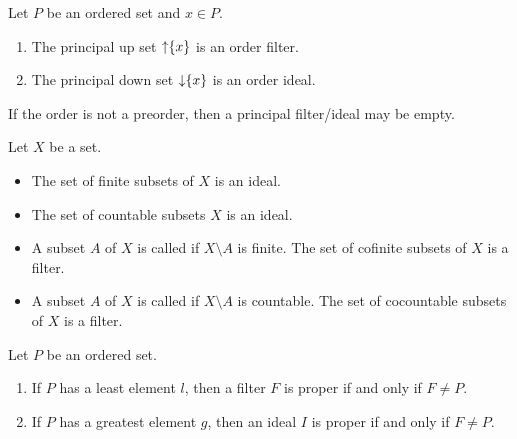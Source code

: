 \begin{lemma}
Let $P$ be an ordered set and $x\in P$.
\begin{enumerate}
\item The principal up set $\operatorname{\uparrow} \{x\}$ is an order filter.
\item The principal down set $\operatorname{\downarrow} \{x\}$ is an order ideal.
\end{enumerate}
\end{lemma}
If the order is not a preorder, then a principal filter/ideal may be empty.

\begin{example}
Let $X$ be a set.
\begin{itemize}
\item The set of finite subsets of $X$ is an ideal.
\item The set of countable subsets $X$ is an ideal.
\item A subset $A$ of $X$ is called  if $X\setminus A$ is finite. The set of cofinite subsets of $X$ is a filter.
\item A subset $A$ of $X$ is called  if $X\setminus A$ is countable. The set of cocountable subsets of $X$ is a filter.
\end{itemize}
\end{example}

\begin{lemma}
Let $P$ be an ordered set.
\begin{enumerate}
\item If $P$ has a least element $l$, then a filter $F$ is proper \textup{if and only if} $F\neq P$.
\item If $P$ has a greatest element $g$, then an ideal $I$ is proper \textup{if and only if} $F\neq P$.
\end{enumerate}
\end{lemma}


